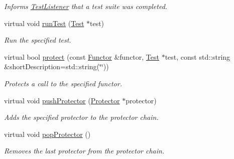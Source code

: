 \begin{DoxyCompactItemize}
\begin{DoxyCompactList}\small\item\em Informs \hyperlink{class_test_listener}{Test\+Listener} that a test suite was completed. \end{DoxyCompactList}\item 
virtual void \hyperlink{class_test_result_ae00af1cdee85b14923b80a01678478ee}{run\+Test} (\hyperlink{class_test}{Test} $\ast$test)
\begin{DoxyCompactList}\small\item\em Run the specified test. \end{DoxyCompactList}\item 
virtual bool \hyperlink{class_test_result_a243b3097a3d9468abc61e7910bbaa8b7}{protect} (const \hyperlink{class_functor}{Functor} \&functor, \hyperlink{class_test}{Test} $\ast$test, const std\+::string \&short\+Description=std\+::string(\char`\"{}\char`\"{}))
\begin{DoxyCompactList}\small\item\em Protects a call to the specified functor. \end{DoxyCompactList}\item 
\hypertarget{class_test_result_a1a4fbbca38cb73e8e00905193b7593dc}{virtual void \hyperlink{class_test_result_a1a4fbbca38cb73e8e00905193b7593dc}{push\+Protector} (\hyperlink{class_protector}{Protector} $\ast$protector)}\label{class_test_result_a1a4fbbca38cb73e8e00905193b7593dc}

\begin{DoxyCompactList}\small\item\em Adds the specified protector to the protector chain. \end{DoxyCompactList}\item 
\hypertarget{class_test_result_acfbbc6037e1af423f93cdb0360076524}{virtual void \hyperlink{class_test_result_acfbbc6037e1af423f93cdb0360076524}{pop\+Protector} ()}\label{class_test_result_acfbbc6037e1af423f93cdb0360076524}

\begin{DoxyCompactList}\small\item\em Removes the last protector from the protector chain. \end{DoxyCompactList}\end{DoxyCompactItemize}
